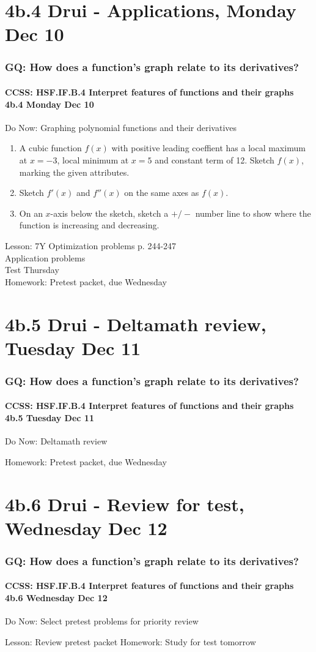 \documentclass{beamer}
\begin{document}
\section{4b.4 Drui - Applications, Monday Dec 10}
  \frame
  {\frametitle{GQ: How does a function's graph relate to its derivatives?}
    \framesubtitle{CCSS: HSF.IF.B.4 Interpret features of functions and their graphs \quad \alert{4b.4 Monday Dec 10}}

    \begin{block}{Do Now: Graphing polynomial functions and their derivatives}
      \begin{enumerate}
        \item A cubic function $f(x)$ with positive leading coeffient has a local maximum at $x=-3$, local minimum at $x=5$ and constant term of 12. Sketch $f(x)$, marking the given attributes.
        \item Sketch $f'(x)$ and $f''(x)$ on the same axes as $f(x)$.
        \item On an $x$-axis below the sketch, sketch a $+/-$ number line to show where the function is increasing and decreasing.
      \end{enumerate}
    \end{block}
    Lesson: 7Y Optimization problems p. 244-247\\
    Application problems\\
    \alert{Test Thursday} \\
    Homework: Pretest packet, due Wednesday
  }

  \section{4b.5 Drui - Deltamath review, Tuesday Dec 11}
    \frame
    {\frametitle{GQ: How does a function's graph relate to its derivatives?}
      \framesubtitle{CCSS: HSF.IF.B.4 Interpret features of functions and their graphs \quad \alert{4b.5 Tuesday Dec 11}}

      \begin{block}{Do Now: Deltamath review}
      \end{block}

      Homework: Pretest packet, due Wednesday
    }


  \section{4b.6 Drui - Review for test, Wednesday Dec 12}
    \frame
    {\frametitle{GQ: How does a function's graph relate to its derivatives?}
      \framesubtitle{CCSS: HSF.IF.B.4 Interpret features of functions and their graphs \quad \alert{4b.6 Wednesday Dec 12}}

      \begin{block}{Do Now: Select pretest problems for priority review}
      \end{block}
      Lesson: Review pretest packet
      Homework: Study for \alert{test tomorrow}
    }
\end{document}
